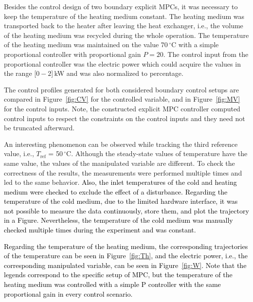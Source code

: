\documentclass[preprint,12pt]{elsarticle}
\newcommand{\change}[1]{\textcolor{black}{#1}}
\begin{document}
Besides the control design of two boundary explicit MPCs, it was necessary to keep the temperature of the heating medium constant. The heating medium was transported back to the heater after leaving the heat exchanger, i.e., the volume of the heating medium was recycled during the whole operation. The temperature of the heating medium was maintained on the value 70\,$^{\circ}\mathrm{C}$ with a simple proportional controller with proportional gain $P = 20$. The control input from the proportional controller was the electric power which could acquire the values in the range [$0-2$]\,kW and was also normalized to percentage.

The control profiles generated for both considered boundary control setups are compared in Figure~\ref{fig:CV} for the controlled variable, and in Figure~\ref{fig:MV} for the control inputs. 
Note, the constructed explicit MPC controller computed control inputs to respect the constraints on the control inputs and they need not be truncated afterward. 

An interesting phenomenon can be observed while tracking the third reference value, i.e., $T_{\mathrm{ref}}$ = 50\,$^{\circ}\mathrm{C}$. Although the steady-state values of temperature have the same value, the values of the manipulated variable are different. To check the correctness of the results, the measurements were performed multiple times and led to the same behavior. \change{Also, the inlet temperatures of the cold and heating medium were checked to exclude the effect of a disturbance. Regarding the temperature of the cold medium, due to the limited hardware interface, it was not possible to measure the data continuously, store them, and plot the trajectory in a Figure. Nevertheless, the temperature of the cold medium was manually checked multiple times during the experiment and was constant.} 

\change{Regarding the temperature of the heating medium, the corresponding trajectories of the temperature can be seen in Figure~\ref{fig:Th}, and the electric power, i.e., the corresponding manipulated variable, can be seen in Figure~\ref{fig:W}. Note that the legends correspond to the specific setup of MPC, but the temperature of the heating medium was controlled with a simple P controller with the same proportional gain in every control scenario.} 
\end{document}
